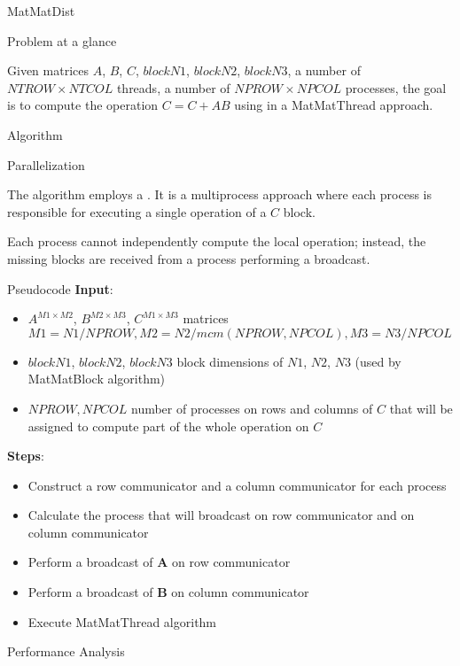 \begin{chapter}{MatMatDist}
    \begin{section}{Problem at a glance}
        \par Given matrices $A$, $B$, $C$, $blockN1$, $blockN2$, $blockN3$, a number of $NTROW \times NTCOL$ threads, a number of $NPROW \times NPCOL$ processes, the goal is to compute the  operation $C = C + AB$ using  in a MatMatThread approach.
    \end{section}
    \begin{section}{Algorithm}
        \begin{subsection}{Parallelization}
            \par The algorithm employs a . It is a multiprocess approach where each process is responsible for executing a single  operation of a $C$ block.
            \par Each process cannot independently compute the local  operation; instead, the missing blocks are received from a process performing a broadcast.
        \end{subsection}
        \begin{subsection}{Pseudocode}
            \textbf{Input}:
            \begin{itemize}
                \item $A^{M1 \times M2}$, $B^{M2 \times M3}$, $C^{M1 \times M3}$ matrices\\
                $M1 = N1 / NPROW, M2 = N2 / mcm(NPROW, NPCOL), M3 = N3 / NPCOL$
                \item $blockN1$, $blockN2$, $blockN3$ block dimensions of $N1$, $N2$, $N3$ (used by MatMatBlock algorithm)
                \item $NPROW, NPCOL$ number of processes on rows and columns of $C$ that will be assigned to compute part of the whole  operation on $C$
            \end{itemize}
            \textbf{Steps}:\\
            \begin{itemize}
                \item Construct a row communicator and a column communicator for each process
                \item Calculate the process that will broadcast on row communicator and on column communicator
                \item Perform a broadcast of $\mathbf{A}$ on row communicator
                \item Perform a broadcast of $\mathbf{B}$ on column communicator
                \item Execute MatMatThread algorithm
            \end{itemize}
            
        \end{subsection}
        \clearpage
        \begin{subsection}{Performance Analysis}

        \end{subsection}
    \end{section}
\end{chapter}
